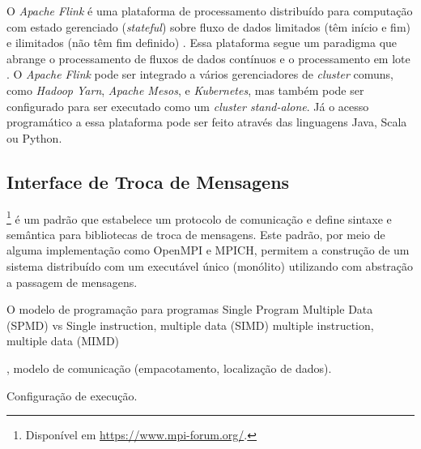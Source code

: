 O \emph{Apache Flink} é uma plataforma de processamento distribuído para
computação com estado gerenciado (\emph{stateful}) sobre fluxo de dados limitados (têm início e
fim) e ilimitados (não têm fim definido) \cite{ApacheFlink2020}.
Essa plataforma segue um paradigma que abrange o processamento de fluxos de
dados contínuos e o processamento em lote \cite{Carbone2015,Lopez2018}.
O \emph{Apache Flink} pode ser integrado a vários gerenciadores de \emph{cluster}
comuns, como \emph{Hadoop Yarn}, \emph{Apache Mesos}, e \emph{Kubernetes}, mas também pode ser
configurado para ser executado como um \emph{cluster stand-alone}.
Já o acesso programático a essa plataforma pode ser feito através das linguagens
Java, Scala ou Python.

\subsection{Interface de Troca de Mensagens}

\mpi\footnote{Disponível em \url{https://www.mpi-forum.org/}.} é um padrão que
estabelece um protocolo de comunicação e define sintaxe e semântica para
bibliotecas de troca de mensagens.
Este padrão, por meio de alguma implementação como OpenMPI e MPICH,
permitem a construção de um sistema distribuído com um executável único
(monólito) utilizando com abstração a passagem de mensagens.

O modelo de programação para programas \mpi
Single Program Multiple Data (SPMD)
vs
Single instruction, multiple data (SIMD) 
multiple instruction, multiple data (MIMD) 

, modelo de comunicação (empacotamento,
localização de dados).

Configuração de execução.
